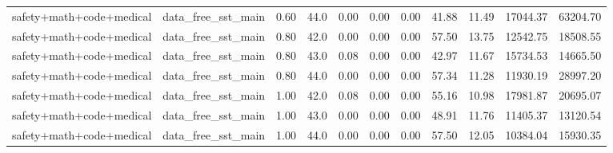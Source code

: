 \documentclass{article}
\begin{document}
\begin{table}[H]
{\begin{tabular}{llllrrrrrrr}
safety+math+code+medical & data\_free\_sst\_main & 0.60 & 44.0 & 0.00 & 0.00 & 0.00 & 41.88 & 11.49 & 17044.37 & 63204.70 \\
safety+math+code+medical & data\_free\_sst\_main & 0.80 & 42.0 & 0.00 & 0.00 & 0.00 & 57.50 & 13.75 & 12542.75 & 18508.55 \\
safety+math+code+medical & data\_free\_sst\_main & 0.80 & 43.0 & 0.08 & 0.00 & 0.00 & 42.97 & 11.67 & 15734.53 & 14665.50 \\
safety+math+code+medical & data\_free\_sst\_main & 0.80 & 44.0 & 0.00 & 0.00 & 0.00 & 57.34 & 11.28 & 11930.19 & 28997.20 \\
safety+math+code+medical & data\_free\_sst\_main & 1.00 & 42.0 & 0.08 & 0.00 & 0.00 & 55.16 & 10.98 & 17981.87 & 20695.07 \\
safety+math+code+medical & data\_free\_sst\_main & 1.00 & 43.0 & 0.00 & 0.00 & 0.00 & 48.91 & 11.76 & 11405.37 & 13120.54 \\
safety+math+code+medical & data\_free\_sst\_main & 1.00 & 44.0 & 0.00 & 0.00 & 0.00 & 57.50 & 12.05 & 10384.04 & 15930.35 \\
\bottomrule
\end{tabular}
}
\end{table}


\begin{table}[H]
\centering
\caption{Alpha スイープ 集計 - Method: mergealign, Pattern: safety+math}
\label{tab:sweep_mergealign_safety_math}
\small
{}
\end{table}
\end{document}
